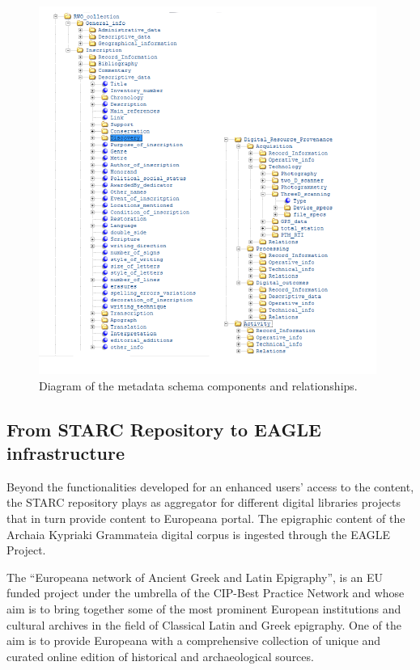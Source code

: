 \documentclass[amsthm,ebook]{saparticle}
\begin{document}
\begin{figure}[!hbp]
\centering
 \includegraphics[width=\columnwidth]{DamnjanovicetalEAGLE2016-img005.pdf}
\caption{Diagram of the metadata schema components and relationships.}
\label{fig:5}
\end{figure}
  
  
\subsection{From STARC Repository to EAGLE infrastructure}


Beyond the functionalities developed for an enhanced users’ access to the content, the STARC repository plays as
aggregator for different digital libraries projects that in turn provide content to Europeana portal. The epigraphic
content of the Archaia Kypriaki Grammateia digital corpus is ingested through the EAGLE Project. 

The ``Europeana network of Ancient Greek and Latin Epigraphy'', is an EU funded project under the umbrella of the CIP-Best
Practice Network and whose aim is to bring together some of the most prominent European institutions and cultural
archives in the field of Classical Latin and Greek epigraphy. One of the aim is to provide Europeana with a
comprehensive collection of unique and curated online edition of historical and archaeological sources.
\end{document}
